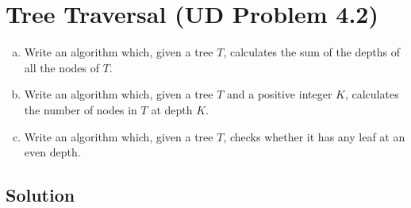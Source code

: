 
\section{Tree Traversal (UD Problem 4.2)}

\begin{enumerate}[(a)]
  \item Write an algorithm which, given a tree $T$,
    calculates the sum of the depths of all the nodes of $T$.
  \item Write an algorithm which, given a tree $T$ and a positive integer $K$,
    calculates the number of nodes in $T$ at depth $K$.
  \item Write an algorithm which, given a tree $T$,
    checks whether it has any leaf at an even depth.
\end{enumerate}

\subsection{Solution}


